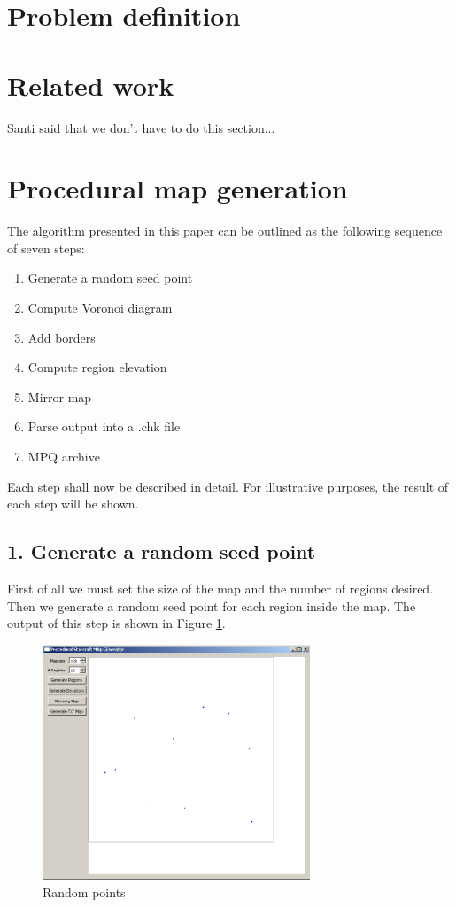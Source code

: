 \documentclass[letterpaper]{article}
\begin{document}
\section{Problem definition} %
\label{sec:problem_definition}




\section{Related work} %
\label{sec:related_work}
Santi said that we don't have to do this section...


\section{Procedural map generation} %
\label{sec:procedural_map_generation}
The algorithm presented in this paper can be outlined as the following sequence of seven steps:
\begin{enumerate}
	\item Generate a random seed point
	\item Compute Voronoi diagram
	\item Add borders
	\item Compute region elevation
	\item Mirror map
	\item Parse output into a .chk file
	\item MPQ archive
\end{enumerate}
Each step shall now be described in detail. For illustrative purposes, the result of each step will be shown.

\subsection{1. Generate a random seed point}
First of all we must set the size of the map and the number of regions desired. Then we generate a random seed point for each region inside the map. The output of this step is shown in Figure \ref{fig:random-points}.

\begin{figure}[ht]
    \centering
    \includegraphics[width=8cm]{PCG01.png}
    \caption{Random points}
    \label{fig:random-points}
\end{figure}
\end{document}
